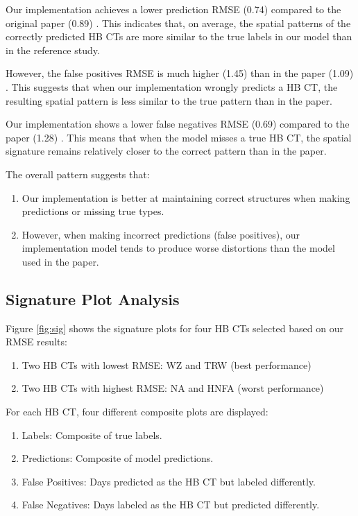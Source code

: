 \documentclass[
]{krantz}
\providecommand{\tightlist}{%
  \setlength{\itemsep}{0pt}\setlength{\parskip}{0pt}}
\begin{document}
Our implementation achieves a lower prediction RMSE (0.74) compared to the original paper (0.89) \citep{Mittermeier2022}.
This indicates that, on average, the spatial patterns of the correctly predicted HB CTs are more similar to the true labels in our model than in the reference study.

However, the false positives RMSE is much higher (1.45) than in the paper (1.09) \citep{Mittermeier2022}.
This suggests that when our implementation wrongly predicts a HB CT,
the resulting spatial pattern is less similar to the true pattern than in the paper.

Our implementation shows a lower false negatives RMSE (0.69) compared to the paper (1.28) \citep{Mittermeier2022}.
This means that when the model misses a true HB CT,
the spatial signature remains relatively closer to the correct pattern than in the paper.

The overall pattern suggests that:

\begin{enumerate}
\def\labelenumi{\arabic{enumi}.}
\tightlist
\item
  Our implementation is better at maintaining correct structures when making predictions or missing true types.
\item
  However, when making incorrect predictions (false positives), our implementation model tends to produce worse distortions than the model used in the paper.
\end{enumerate}

\subsection{Signature Plot Analysis}\label{signature-plot-analysis}

Figure \ref{fig:sig} shows the signature plots for four HB CTs selected based on our RMSE results:

\begin{enumerate}
\def\labelenumi{\arabic{enumi}.}
\tightlist
\item
  Two HB CTs with lowest RMSE: WZ and TRW (best performance)
\item
  Two HB CTs with highest RMSE: NA and HNFA (worst performance)
\end{enumerate}

For each HB CT, four different composite plots are displayed:

\begin{enumerate}
\def\labelenumi{\arabic{enumi}.}
\tightlist
\item
  Labels: Composite of true labels.
\item
  Predictions: Composite of model predictions.
\item
  False Positives: Days predicted as the HB CT but labeled differently.
\item
  False Negatives: Days labeled as the HB CT but predicted differently.
\end{enumerate}
\end{document}
